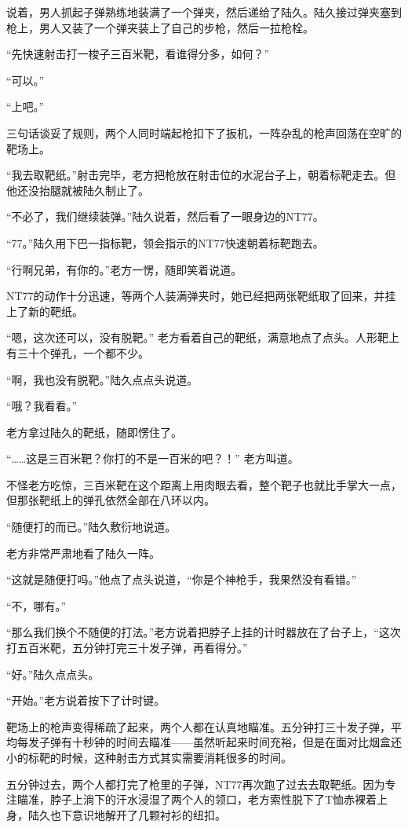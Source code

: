 说着，男人抓起子弹熟练地装满了一个弹夹，然后递给了陆久。陆久接过弹夹塞到枪上，男人又装了一个弹夹装上了自己的步枪，然后一拉枪栓。

“先快速射击打一梭子三百米靶，看谁得分多，如何？”

“可以。”

“上吧。”

三句话谈妥了规则，两个人同时端起枪扣下了扳机，一阵杂乱的枪声回荡在空旷的靶场上。

“我去取靶纸。”射击完毕，老方把枪放在射击位的水泥台子上，朝着标靶走去。但他还没抬腿就被陆久制止了。

“不必了，我们继续装弹。”陆久说着，然后看了一眼身边的NT77。

“77。”陆久用下巴一指标靶，领会指示的NT77快速朝着标靶跑去。

“行啊兄弟，有你的。”老方一愣，随即笑着说道。

NT77的动作十分迅速，等两个人装满弹夹时，她已经把两张靶纸取了回来，并挂上了新的靶纸。

“嗯，这次还可以，没有脱靶。” 老方看着自己的靶纸，满意地点了点头。人形靶上有三十个弹孔，一个都不少。

“啊，我也没有脱靶。”陆久点点头说道。

“哦？我看看。”

老方拿过陆久的靶纸，随即愣住了。

“……这是三百米靶？你打的不是一百米的吧？！” 老方叫道。

不怪老方吃惊，三百米靶在这个距离上用肉眼去看，整个靶子也就比手掌大一点，但那张靶纸上的弹孔依然全部在八环以内。

“随便打的而已。”陆久敷衍地说道。

老方非常严肃地看了陆久一阵。

“这就是随便打吗。”他点了点头说道，“你是个神枪手，我果然没有看错。”

“不，哪有。”

“那么我们换个不随便的打法。”老方说着把脖子上挂的计时器放在了台子上，“这次打五百米靶，五分钟打完三十发子弹，再看得分。”

“好。”陆久点点头。

“开始。”老方说着按下了计时键。

靶场上的枪声变得稀疏了起来，两个人都在认真地瞄准。五分钟打三十发子弹，平均每发子弹有十秒钟的时间去瞄准——虽然听起来时间充裕，但是在面对比烟盒还小的标靶的时候，这种射击方式其实需要消耗很多的时间。

五分钟过去，两个人都打完了枪里的子弹，NT77再次跑了过去去取靶纸。因为专注瞄准，脖子上淌下的汗水浸湿了两个人的领口，老方索性脱下了T恤赤裸着上身，陆久也下意识地解开了几颗衬衫的纽扣。

